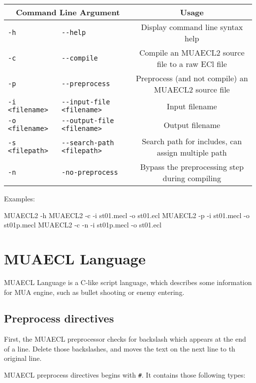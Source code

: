 \documentclass{article}
\begin{document}
\begin{table}[H]
	\centering
	\begin{tabular}{l|l|c}
		\hline
		\multicolumn{2}{c|}{Command Line Argument} & Usage \\\hline
		\verb|-h| & \verb|--help| & Display command line syntax help \\\hline
		\verb|-c| & \verb|--compile| & Compile an MUAECL2 source file to a raw ECl file \\\hline
		\verb|-p| & \verb|--preprocess| & Preprocess (and not compile) an MUAECL2 source file \\\hline
		\verb|-i <filename>| & \verb|--input-file <filename>| & Input filename \\\hline
		\verb|-o <filename>| & \verb|--output-file <filename>| & Output filename \\\hline
		\verb|-s <filepath>| & \verb|--search-path <filepath>| & Search path for includes, can assign multiple path \\\hline
		\verb|-n| & \verb|-no-preprocess| & Bypass the preprocessing step during compiling \\\hline
	\end{tabular}
\end{table}

Examples:

\begin{MUAvbt}
MUAECL2 -h
MUAECL2 -c -i st01.mecl -o st01.ecl
MUAECL2 -p -i st01.mecl -o st01p.mecl
MUAECL2 -c -n -i st01p.mecl -o st01.ecl
\end{MUAvbt}

\section{MUAECL Language}

MUAECL Language is a C-like script language, which describes some information for MUA engine, such as bullet shooting or enemy entering.

\subsection{Preprocess directives}

First, the MUAECL preprocessor checks for backslash which appears at the end of a line. Delete those backslashes, and moves the text on the next line to th original line.

MUAECL preprocess directives begins with \verb|#|. It contains those following types:
\end{document}
